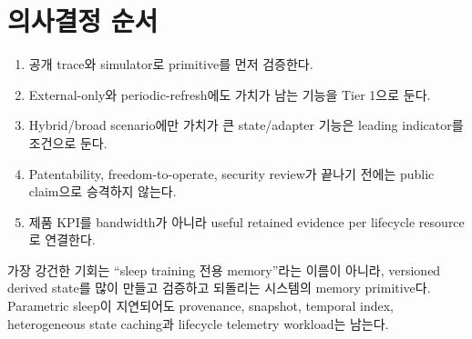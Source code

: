 \section{의사결정 순서}

\begin{enumerate}
  \item 공개 trace와 simulator로 primitive를 먼저 검증한다.
  \item External-only와 periodic-refresh에도 가치가 남는 기능을 Tier 1으로 둔다.
  \item Hybrid/broad scenario에만 가치가 큰 state/adapter 기능은 leading indicator를 조건으로 둔다.
  \item Patentability, freedom-to-operate, security review가 끝나기 전에는 public claim으로 승격하지 않는다.
  \item 제품 KPI를 bandwidth가 아니라 useful retained evidence per lifecycle resource로 연결한다.
\end{enumerate}

\begin{keypoint}
가장 강건한 기회는 ``sleep training 전용 memory''라는 이름이 아니라, versioned derived state를 많이
만들고 검증하고 되돌리는 시스템의 memory primitive다. Parametric sleep이 지연되어도 provenance,
snapshot, temporal index, heterogeneous state caching과 lifecycle telemetry workload는 남는다.
\end{keypoint}
